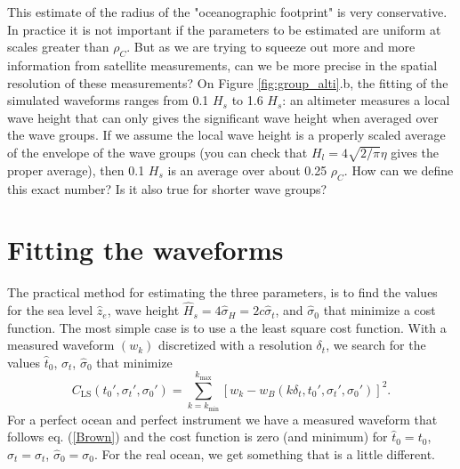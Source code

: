 This estimate of the radius of the "oceanographic footprint" is very conservative. In practice it is not important if the parameters to be estimated are uniform at scales greater than $\rho_C$. But as we are trying to squeeze out more and more information from satellite measurements, can we be more precise in the spatial resolution of these measurements?  On Figure \ref{fig:group_alti}.b, the fitting of the simulated waveforms ranges from 0.1 $H_s$ to 1.6 $H_s$: an altimeter measures a local wave height that can only gives the significant wave height when averaged over the wave groups. If we assume the local wave height is a properly scaled average of the envelope of the wave groups (you can check that $H_l=4\sqrt{2/\pi} \eta$ gives the proper average), then 0.1  $H_s$  is an average over about 0.25 $\rho_C$. How can we define this exact number? Is it also true for shorter wave groups? 







\section{Fitting the waveforms}

The practical method for estimating the three parameters, is to find the values for the sea level $\widehat{z}_e$, wave height $\widehat{H}_s=4 \widehat{\sigma}_H= 2 c \widehat{\sigma}_t$, and $\widehat{\sigma}_0$ that minimize a cost function. The most simple case is to use a the least square cost 
function. With a measured waveform $(w_k)$ discretized with a resolution $\delta_t$, we search for the values  $\widehat{t}_0$, $\widehat{\sigma}_t$, $\widehat{\sigma}_0$ that minimize 
\begin{equation} 
    C_{\mathrm{LS}}(t_0',\sigma_t',\sigma_0')=\sum_{k=k_{\min}}^{k_{\max}}  \left[ w_k - w_B(k \delta_t,t_0',\sigma_t',\sigma_0') \right]^2. \label{eq_CLS}
\end{equation}
For a perfect ocean and perfect instrument we have a measured waveform that follows eq. (\ref{Brown}) and the cost function is zero (and minimum) for 
$\widehat{t}_0=t_0$, $\widehat{\sigma}_t=\sigma_t$, $\widehat{\sigma}_0=\sigma_0$. For the real ocean, we get something that is a little different. 

